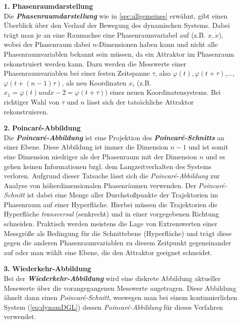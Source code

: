 \begin{itemize}
    \item[\textbf{1.}]{\textbf{Phasenraumdarstellung}}\\
    Die \textit{\textbf{Phasenraumdarstellung}} wie in \ref{sec:allgemeines} erwähnt, gibt einen Überblick über den Verlauf der Bewegung des dynamischen Systems. Dabei trägt man je an eine Raumachse eine Phasenraumvariabel auf (z.B. $x, \dot{x}$), wobei der Phasenraum dabei $n$-Dimensionen haben kann und nicht alle Phasenraumvariablen bekannt sein müssen, da ein Attraktor im Phasenraum rekonstruiert werden kann. Dazu werden die Messwerte einer Phasenraumvariablen bei einer festen Zeitspanne $\tau$, also $\varphi(t), \varphi(t+\tau)$,..., $\varphi(t+(n-1)\tau)$, als neu Koordinaten $x_i$ (z.B. $x_1=\varphi(t) und x-2=\varphi(t+\tau))$ eines neuen Koordinatensystems. Bei richtiger Wahl von $\tau$ und $n$ lässt sich der tatsächliche Attraktor rekonstruieren. \citep{Lueck}
    \item[\textbf{2.}]{\textbf{Poincar\'e-Abbildung}}\\
    Die \textit{\textbf{Poincar\'e-Abbildung}} ist eine Projektion des \textit{\textbf{Poincar\'e-Schnitts}} an einer Ebene. Diese Abbildung ist immer die Dimension $n-1$ und ist somit eine Dimension niedriger als der Phasenraum mit der Dimension $n$ und es gehen keinen Informationen bzgl. dem Langzeitverhalten des Systems verloren. Aufgrund dieser Tatsache lässt sich die \textit{Poincar\'e-Abbildung} zur Analyse von höherdimensionalen Phasenräumen verwenden. Der \textit{Poincar\'e-Schnitt} ist dabei eine Menge aller Durchstoßpunkte der Trajektorien im Phasenraum auf einer Hyperfläche. Hierbei müssen die Trajektorien die Hyperfläche \textit{transversal} (senkrecht) und in einer vorgegebenen Richtung schneiden. Praktisch werden meistens die Lage von Extremwerten einer Messgröße als Bedingung für die Schnittebene (Hyperfläche) und trägt diese gegen die anderen Phasenraumvariablen zu diesem Zeitpunkt gegeneinander auf oder man wählt eine Ebene, die den Attraktor geeignet schneidet. \citep{Lueck}
    \item[\textbf{3.}]{\textbf{Wiederkehr-Abbildung}}\\
    Bei der \textit{\textbf{Wiederkehr-Abbildung}} wird eine diskrete Abbildung aktueller Messwerte über die vorangegangenen Messwerte augetragen. Diese Abbildung ähnelt dann einen \textit{Poincar\'e-Schnitt}, weswegen man bei einem kontinuierlichen System (\ref{eq:dynamDGL}) dessen \textit{Poincar\'e-Abbildung} für dieses Verfahren verwendet. \citep{Lueck}

\end{itemize}
